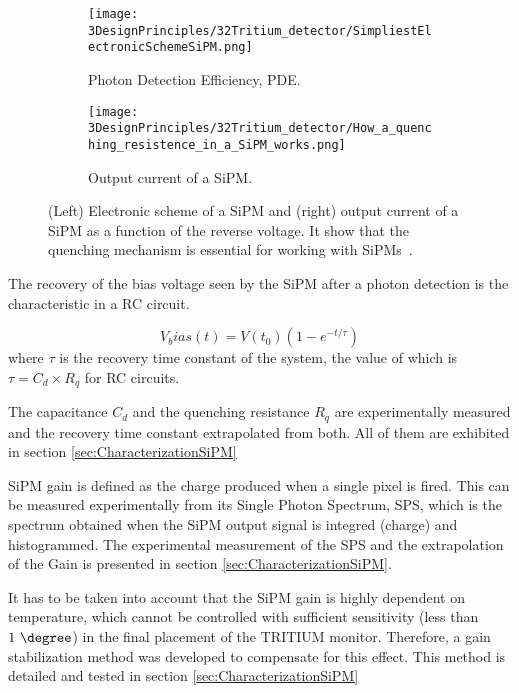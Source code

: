 \begin{figure}
\centering
    \begin{subfigure}[b]{0.45\textwidth}
    \centering
    \texttt{[image: 3DesignPrinciples/32Tritium\_detector/SimpliestElectronicSchemeSiPM.png]}  
    \caption{Photon Detection Efficiency, PDE.\label{subfig:ElectricModelSiPM}}
    \end{subfigure}
    \hfill
    \begin{subfigure}[b]{0.45\textwidth}
    \centering
    \texttt{[image: 3DesignPrinciples/32Tritium\_detector/How\_a\_quenching\_resistence\_in\_a\_SiPM\_works.png]}  
    \caption{Output current of a SiPM.\label{subfig:HowSiPMworks}}
    \end{subfigure}
 \caption{(Left) Electronic scheme of a SiPM and (right) output current of a SiPM as a function of the reverse voltage. It show that the quenching mechanism is essential for working with SiPMs~\cite{DataSheetSensL}.}
 \label{fig:ChenchingResistance}
\end{figure}

The recovery of the bias voltage seen by the SiPM after a photon detection is the characteristic in a RC circuit. 

\begin{equation}
V_bias(t)=V(t_0)\left(1-e^{-t/\tau} \right)
\label{RCCircuitBiasVoltage}
\end{equation}
where $\tau$ is the recovery time constant of the system, the value of which is $\tau=C_d \times R_q$ for RC circuits.

The capacitance $C_d$ and the quenching resistance $R_q$ are experimentally measured and the recovery time constant extrapolated from both. All of them are exhibited in section \ref{sec:CharacterizationSiPM}

SiPM gain is defined as the charge produced when a single pixel is fired. This can be measured experimentally from its Single Photon Spectrum, SPS, which is the spectrum obtained when the SiPM output signal is integred (charge) and histogrammed. The experimental measurement of the SPS and the extrapolation of the Gain is presented in section \ref{sec:CharacterizationSiPM}.

It has to be taken into account that the SiPM gain is highly dependent on temperature, which cannot be controlled with sufficient sensitivity (less than $1~\degree$) in the final placement of the TRITIUM monitor. Therefore, a gain stabilization method was developed to compensate for this effect. This method is detailed and tested in section \ref{sec:CharacterizationSiPM}

